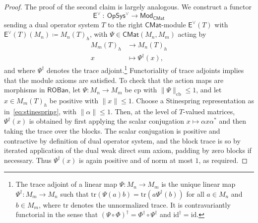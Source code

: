 \documentclass[11pt,onecolumn]{article}
\newcommand{\ROBan}{\mathsf{ROBan}}
\newcommand{\Mod}{\mathsf{Mod}}
\newcommand{\OpSys}{\mathsf{OpSys}}
\theoremstyle{plain}
\theoremstyle{remark}
\theoremstyle{definition}
\begin{document}
\begin{proof}
	The proof of the second claim is largely analogous.
	We construct a functor
	\[
		\mathsf{E}^{\vee} \: : \: \OpSys^\vee \longrightarrow \Mod_\mathsf{CMat}
	\]
	sending a dual operator system $T$ to the right $\mathsf{CMat}$-module $\mathsf{E}^{\vee}(T)$ with $\mathsf{E}^{\vee}(T)(M_n) \coloneqq M_n(T)_h$,
	with $\Psi \in \mathsf{CMat}(M_n,M_m)$ acting by
	\begin{align*}
		M_m(T)_h & \longrightarrow M_n(T)_h \\
		x & \longmapsto \Psi^\dagger(x),
	\end{align*}
	and where $\Psi^\dagger$ denotes the trace adjoint.\footnote{The trace adjoint of a linear map $\Psi \colon M_n \to M_m$
		is the unique linear map $\Psi^\dagger \colon M_m \to M_n$ such that $\mathrm{tr}(\Psi(a)b) = \mathrm{tr}(a\Psi^\dagger(b))$ for all $a \in M_n$ and $b \in M_m$,
		where $\mathrm{tr}$ denotes the unnormalized trace.
		It is contravariantly functorial in the sense that $(\Psi \circ \Phi)^\dagger = \Phi^\dagger \circ \Psi^\dagger$ and $\mathrm{id}^\dagger = \mathrm{id}$.}
	Functoriality of trace adjoints implies that the module axioms are satisfied.
	To check that the action maps are morphisms in $\ROBan$,
	let $\Psi \colon M_n \to M_m$ be cp with $\|\Psi\|_{\mathrm{cb}} \le 1$, and let $x \in M_m(T)_h$ be positive with $\|x\| \le 1$.
	Choose a Stinespring representation as in~\eqref{eq:stinespring}, with $\|\alpha\| \le 1$.
	Then, at the level of $T$-valued matrices, $\Psi^\dagger(x)$ is obtained by first applying the scalar conjugation $x \mapsto \alpha x \alpha^*$ and then taking the trace over the blocks.
	The scalar conjugation is positive and contractive by definition of dual operator system,
	and the block trace is so by iterated application of the dual weak direct sum axiom, padding by zero blocks if necessary.
	Thus $\Psi^\dagger(x)$ is again positive and of norm at most $1$, as required.


\end{proof}
\end{document}
